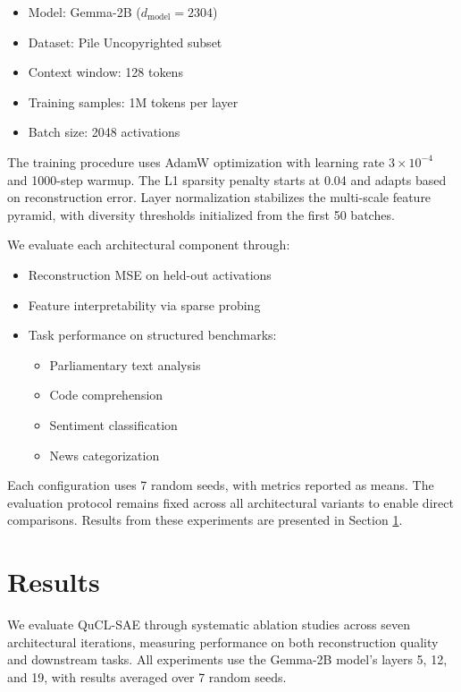\documentclass{article} %
\begin{document}
\begin{itemize}
    \item Model: Gemma-2B ($d_{\text{model}}=2304$)
    \item Dataset: Pile Uncopyrighted subset \cite{Gao2020ThePA}
    \item Context window: 128 tokens
    \item Training samples: 1M tokens per layer
    \item Batch size: 2048 activations
\end{itemize}

The training procedure uses AdamW optimization \cite{loshchilov2017adamw} with learning rate $3 \times 10^{-4}$ and 1000-step warmup. The L1 sparsity penalty starts at 0.04 and adapts based on reconstruction error. Layer normalization \cite{ba2016layer} stabilizes the multi-scale feature pyramid, with diversity thresholds initialized from the first 50 batches.

We evaluate each architectural component through:

\begin{itemize}
    \item Reconstruction MSE on held-out activations
    \item Feature interpretability via sparse probing
    \item Task performance on structured benchmarks:
    \begin{itemize}
        \item Parliamentary text analysis
        \item Code comprehension
        \item Sentiment classification
        \item News categorization
    \end{itemize}
\end{itemize}

Each configuration uses 7 random seeds, with metrics reported as means. The evaluation protocol remains fixed across all architectural variants to enable direct comparisons. Results from these experiments are presented in Section \ref{sec:results}.

\section{Results}
\label{sec:results}

We evaluate QuCL-SAE through systematic ablation studies across seven architectural iterations, measuring performance on both reconstruction quality and downstream tasks. All experiments use the Gemma-2B model's layers 5, 12, and 19, with results averaged over 7 random seeds.
\end{document}
